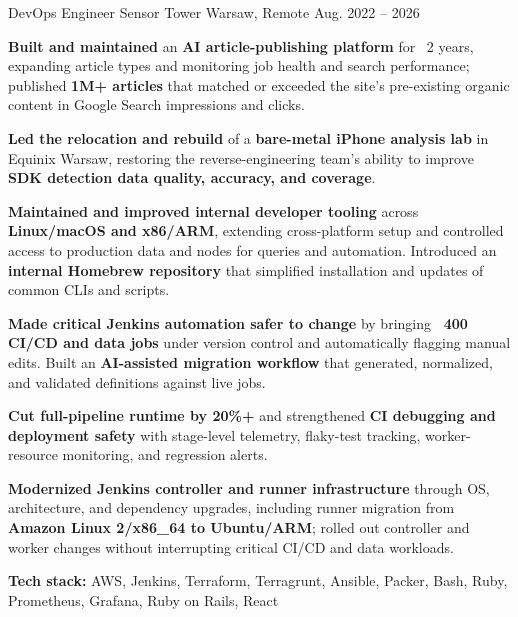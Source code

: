 \vspace{-3mm}

\begin{cventries}

  \cventry
    {DevOps Engineer}
    {Sensor Tower}
    {Warsaw, Remote}
    {Aug. 2022 -- 2026}
    {
      \begin{cvitems}
        \item {\textbf{Built and maintained} an \textbf{AI article-publishing platform} for ~2 years, expanding article types and monitoring job health and search performance; published \textbf{1M+ articles} that matched or exceeded the site’s pre-existing organic content in Google Search impressions and clicks.}
        \item {\textbf{Led the relocation and rebuild} of a \textbf{bare-metal iPhone analysis lab} in Equinix Warsaw, restoring the reverse-engineering team’s ability to improve \textbf{SDK detection data quality, accuracy, and coverage}.}
        \item {\textbf{Maintained and improved internal developer tooling} across \textbf{Linux/macOS and x86/ARM}, extending cross-platform setup and controlled access to production data and nodes for queries and automation. Introduced an \textbf{internal Homebrew repository} that simplified installation and updates of common CLIs and scripts.}
        \item {\textbf{Made critical Jenkins automation safer to change} by bringing \textbf{~400 CI/CD and data jobs} under version control and automatically flagging manual edits. Built an \textbf{AI-assisted migration workflow} that generated, normalized, and validated definitions against live jobs.}
        \item {\textbf{Cut full-pipeline runtime by 20\%+} and strengthened \textbf{CI debugging and deployment safety} with stage-level telemetry, flaky-test tracking, worker-resource monitoring, and regression alerts.}
        \item {\textbf{Modernized Jenkins controller and runner infrastructure} through OS, architecture, and dependency upgrades, including runner migration from \textbf{Amazon Linux 2/x86\_64 to Ubuntu/ARM}; rolled out controller and worker changes without interrupting critical CI/CD and data workloads.}
        \item {\textbf{Tech stack:} AWS, Jenkins, Terraform, Terragrunt, Ansible, Packer, Bash, Ruby, Prometheus, Grafana, Ruby on Rails, React}
      \end{cvitems}
    }


\end{cventries}
